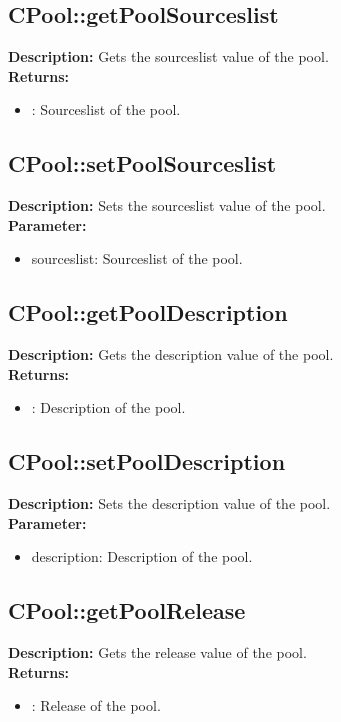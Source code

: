 \subsection{CPool::getPoolSourceslist}
\textbf{Description:} Gets the sourceslist value of the pool.\\
\textbf{Returns:}
\begin{itemize}
\item : Sourceslist of the pool.
\end{itemize}

\subsection{CPool::setPoolSourceslist}
\textbf{Description:} Sets the sourceslist value of the pool.\\
\textbf{Parameter:}
\begin{itemize}
\item sourceslist: Sourceslist of the pool.
\end{itemize}

\subsection{CPool::getPoolDescription}
\textbf{Description:} Gets the description value of the pool.\\
\textbf{Returns:}
\begin{itemize}
\item : Description of the pool.
\end{itemize}

\subsection{CPool::setPoolDescription}
\textbf{Description:} Sets the description value of the pool.\\
\textbf{Parameter:}
\begin{itemize}
\item description: Description of the pool.
\end{itemize}

\subsection{CPool::getPoolRelease}
\textbf{Description:} Gets the release value of the pool.\\
\textbf{Returns:}
\begin{itemize}
\item : Release of the pool.
\end{itemize}

